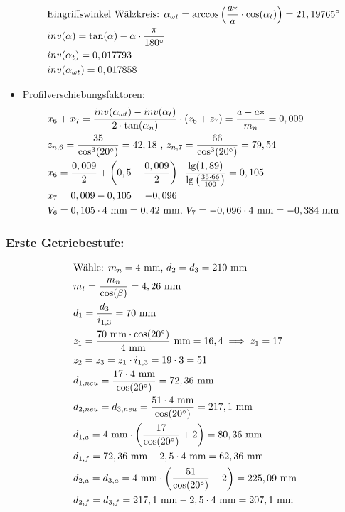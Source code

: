 \begin{itemize}
\begin{align*}
	&\text{Eingriffswinkel Wälzkreis: } \alpha_{\omega t} = \arccos \left( \frac{a*}{a} \cdot \cos(\alpha_t)\right) = 21,19765 ^\circ \\
	&inv(\alpha) = \tan(\alpha) -\alpha \cdot \frac{\pi}{180^\circ} \\
	&inv(\alpha_t) = 0,017793 \\
	&inv(\alpha_{\omega t}) = 0,017858 
\end{align*}
\item Profilverschiebungsfaktoren:
\begin{align*}
	&x_6 + x_7 = \frac{inv(\alpha_{\omega t})-inv(\alpha_{t})}{2 \cdot \tan(\alpha_n)} \cdot (z_6 + z_7) = \frac{a - a*}{m_n} = 0,009 \\
	&z_{n,6} = \frac{35}{\cos^3(20^\circ)} = 42,18 \text{ , }z_{n,7} = \frac{66}{\cos^3(20^\circ)} = 79,54 \\
	&x_6 =\frac{0,009}{2} + \left( 0,5 - \frac{0,009}{2} \right) \cdot \frac{\lg(1,89)}{\lg\left( \frac{35 \cdot 66}{100} \right)} = 0,105 \\
	&x_7 = 0,009 - 0,105 = - 0,096 \\ 
	&V_6 = 0,105 \cdot 4 \text{ mm} = 0,42 \text{ mm, }V_7 = -0,096\cdot 4 \text{ mm} = -0,384 \text{ mm} 
	\end{align*}
\end{itemize}
\subsubsection{Erste Getriebestufe:}
\begin{align*}
	&\text{Wähle: } m_n= 4\text{ mm, } d_2 = d_3 = 210 \text{ mm} \\
	&m_t =  \frac{m_n}{\cos(\beta)} = 4,26 \text{ mm} \\
	&d_1 = \frac{d_3}{i_{1,3}} = 70 \text{ mm} \\
	&z_1 = \frac{70 \text{ mm} \cdot \cos(20^\circ)}{4 \text{ mm}} \text{ mm} = 16,4 \implies z_1 = 17\\
	&z_2=z_3 = z_1 \cdot i_{1,3} =19 \cdot 3 = 51 \\
	&d_{1,neu} = \frac{17 \cdot 4 \text{ mm}}{\cos(20^\circ)} = 72,36 \text{ mm} \\
	&d_{2,neu} = d_{3,neu} = \frac{51 \cdot 4 \text{ mm}}{\cos(20^\circ)} = 217,1 \text{ mm} \\
	&d_{1,a} = 4\text{ mm} \cdot \left(\frac{17}{\cos(20^\circ)}+2\right) =80,36\text{ mm} \\
	&d_{1,f} = 72,36\text{ mm} -2,5 \cdot 4\text{ mm} =62,36\text{ mm} \\
	&d_{2,a} = d_{3,a} =4\text{ mm} \cdot \left(\frac{51}{\cos(20^\circ)}+2\right) =225,09\text{ mm} \\
	&d_{2,f} =d_{3,f} = 217,1\text{ mm} -2,5 \cdot 4\text{ mm} =207,1\text{ mm} \\
\end{align*}
